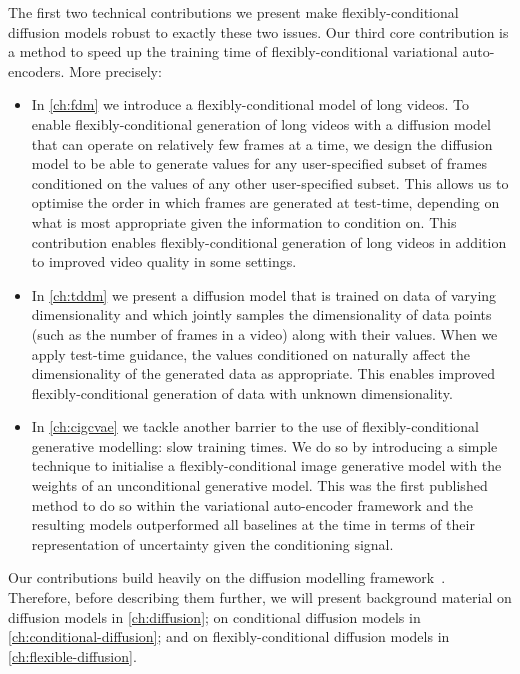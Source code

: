 The first two technical contributions we present make flexibly-conditional diffusion models robust to exactly these two issues. Our third core contribution is a method to speed up the training time of flexibly-conditional variational auto-encoders. More precisely:
\begin{itemize}
    \item In \cref{ch:fdm} we introduce a flexibly-conditional model of long videos. To enable flexibly-conditional generation of long videos with a diffusion model that can operate on relatively few frames at a time, we design the diffusion model to be able to generate values for any user-specified subset of frames conditioned on the values of any other user-specified subset. This allows us to optimise the order in which frames are generated at test-time, depending on what is most appropriate given the information to condition on. This contribution enables flexibly-conditional generation of long videos in addition to improved video quality in some settings.
    \item In \cref{ch:tddm} we present a diffusion model that is trained on data of varying dimensionality and which jointly samples the dimensionality of data points (such as the number of frames in a video) along with their values. When we apply test-time guidance, the values conditioned on naturally affect the dimensionality of the generated data as appropriate. This enables improved flexibly-conditional generation of data with unknown dimensionality.
    \item In \cref{ch:cigcvae} we tackle another barrier to the use of flexibly-conditional generative modelling: slow training times. We do so by introducing a simple technique to initialise a flexibly-conditional image generative model with the weights of an unconditional generative model. This was the first published method to do so within the variational auto-encoder framework and the resulting models outperformed all baselines at the time in terms of their representation of uncertainty given the conditioning signal.
\end{itemize}
Our contributions build heavily on the diffusion modelling framework~\citep{sohl2015deep,ho2020denoising}. Therefore, before describing them further, we will present background material on diffusion models in \cref{ch:diffusion}; on conditional diffusion models in \cref{ch:conditional-diffusion}; and on flexibly-conditional diffusion models in \cref{ch:flexible-diffusion}.



